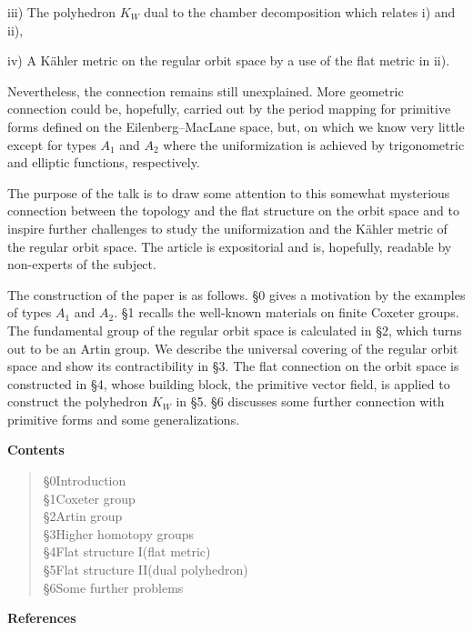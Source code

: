 \documentclass[uplatex,dvipdfmx]{jlreq}
\begin{document}
\medskip
\noindent
iii) The polyhedron $K_W$ dual to the chamber decomposition
which relates i) and ii),

\medskip
\noindent
iv) A Kähler metric on the regular orbit space
by a use of the flat metric in ii).

\medskip
\noindent
Nevertheless, the connection remains still unexplained.
More geometric connection could be,
hopefully, carried out by the period mapping for primitive forms \cite{S2}
defined on the Eilenberg--MacLane space, but, on which
we know very little except for types $A_1$ and $A_2$
where the uniformization is achieved by
trigonometric and elliptic functions, respectively.

The purpose of the talk is to draw some attention
to this somewhat mysterious connection between the topology and
the flat structure on the orbit space
and to inspire further challenges to study the
uniformization and the Kähler metric of the regular orbit space.
The article is expositorial and is, hopefully,
readable by non-experts of the subject.

The construction of the paper is as follows.
\S0 gives a motivation by the examples of types $A_1$ and $A_2$.
\S1 recalls the well-known materials on finite Coxeter groups.
The fundamental group of the regular orbit space is calculated in \S2,
which turns out to be an Artin group.
We describe the universal covering of the regular orbit space and
show its contractibility in \S3.
The flat connection on the orbit space is constructed in \S4,
whose building block, the primitive vector field,
is applied to construct the polyhedron $K_W$ in \S5.
\S6 discusses some further connection with primitive forms and
some generalizations.

\medskip
\begin{center}
  \textbf{Contents}
\end{center}

\begin{quote}
  \S0\quad Introduction\\
  \S1\quad Coxeter group\\
  \S2\quad Artin group\\
  \S3\quad Higher homotopy groups\\
  \S4\quad Flat structure I\quad (flat metric)\\
  \S5\quad Flat structure II\quad (dual polyhedron)\\
  \S6\quad Some further problems
\end{quote}

\medskip
\begin{center}
  \textbf{References}
\end{center}
\end{document}
